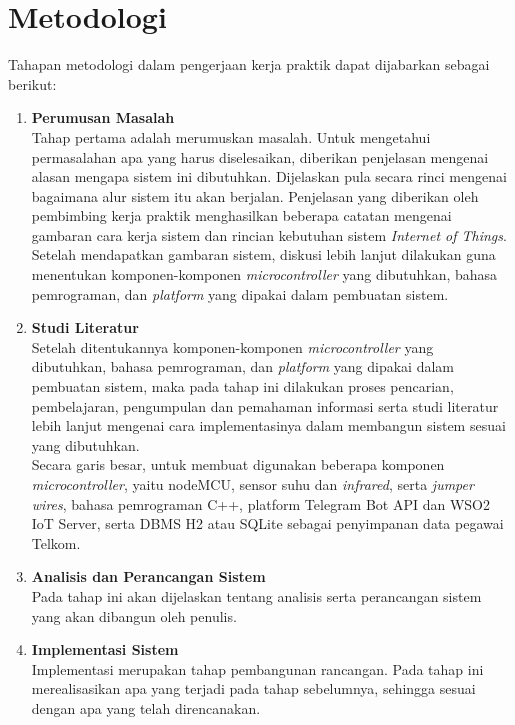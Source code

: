 \section{Metodologi}
\tab Tahapan metodologi dalam pengerjaan kerja praktik dapat dijabarkan sebagai berikut:
\begin{enumerate}
	\item \textbf{Perumusan Masalah}\\
	\tab Tahap pertama adalah merumuskan masalah. Untuk mengetahui permasalahan apa yang harus diselesaikan, diberikan penjelasan mengenai alasan mengapa sistem ini dibutuhkan. Dijelaskan pula secara rinci mengenai bagaimana alur sistem itu akan berjalan. Penjelasan yang diberikan oleh pembimbing kerja praktik menghasilkan beberapa catatan mengenai gambaran cara kerja sistem dan rincian kebutuhan sistem \textit{Internet of Things}. Setelah mendapatkan gambaran sistem, diskusi lebih lanjut dilakukan guna menentukan komponen-komponen \textit{microcontroller} yang dibutuhkan, bahasa pemrograman, dan \textit{platform} yang dipakai dalam pembuatan sistem.\\
	\item \textbf{Studi Literatur}\\
	\tab Setelah ditentukannya komponen-komponen \textit{microcontroller} yang dibutuhkan, bahasa pemrograman, dan \textit{platform} yang dipakai dalam pembuatan sistem, maka pada tahap ini dilakukan proses pencarian, pembelajaran, pengumpulan
	dan pemahaman informasi serta studi literatur lebih lanjut mengenai cara implementasinya dalam membangun sistem sesuai yang dibutuhkan.\\
	\tab Secara garis besar, untuk membuat \namaSistem digunakan beberapa komponen \textit{microcontroller}, yaitu nodeMCU, sensor suhu dan \textit{infrared}, serta \textit{jumper wires}, bahasa pemrograman C++, platform Telegram Bot API dan WSO2 IoT Server, serta DBMS H2 atau SQLite sebagai penyimpanan data pegawai Telkom.\\
	\item \textbf{Analisis dan Perancangan Sistem}\\
	\tab Pada tahap ini akan dijelaskan tentang analisis serta perancangan sistem yang akan dibangun oleh penulis.\\
	\item \textbf{Implementasi Sistem}\\
	\tab Implementasi merupakan tahap pembangunan rancangan. Pada tahap ini merealisasikan apa yang terjadi pada tahap sebelumnya, sehingga sesuai dengan apa yang telah direncanakan.\\

\end{enumerate}
